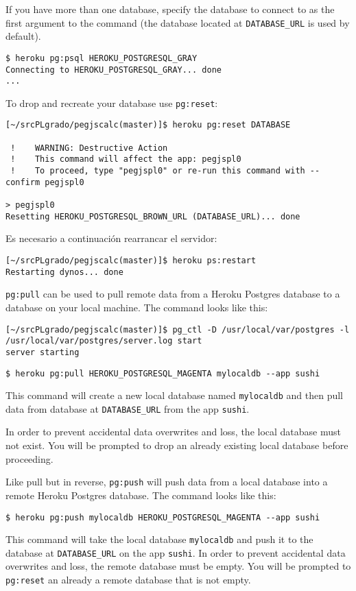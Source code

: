 If you have more than one database, specify the database to connect to as
the first argument to the command (the database located at \verb|DATABASE_URL|
is used by default).
\begin{verbatim}
$ heroku pg:psql HEROKU_POSTGRESQL_GRAY
Connecting to HEROKU_POSTGRESQL_GRAY... done
...
\end{verbatim}

 To drop and recreate your database use \verb|pg:reset|:

\begin{verbatim}
[~/srcPLgrado/pegjscalc(master)]$ heroku pg:reset DATABASE

 !    WARNING: Destructive Action
 !    This command will affect the app: pegjspl0
 !    To proceed, type "pegjspl0" or re-run this command with --confirm pegjspl0

> pegjspl0
Resetting HEROKU_POSTGRESQL_BROWN_URL (DATABASE_URL)... done
\end{verbatim}
Es necesario a continuación rearrancar el servidor:
\begin{verbatim}
[~/srcPLgrado/pegjscalc(master)]$ heroku ps:restart
Restarting dynos... done
\end{verbatim}


\verb|pg:pull| can be used to pull remote data from a Heroku Postgres
database to a database on your local machine. The command looks like this:
\begin{verbatim}
[~/srcPLgrado/pegjscalc(master)]$ pg_ctl -D /usr/local/var/postgres -l /usr/local/var/postgres/server.log start
server starting
\end{verbatim}

\begin{verbatim}
$ heroku pg:pull HEROKU_POSTGRESQL_MAGENTA mylocaldb --app sushi
\end{verbatim}
This command will create a new local database named \verb|mylocaldb| and
then pull data from database at \verb|DATABASE_URL| from the app 
\verb|sushi|. 

In
order to prevent accidental data overwrites and loss, the local database
must not exist. You will be prompted to drop an already existing local
database before proceeding.

Like pull but in reverse, \verb|pg:push| will push data from a local
database into a remote Heroku Postgres database. The command looks
like this:
\begin{verbatim}
$ heroku pg:push mylocaldb HEROKU_POSTGRESQL_MAGENTA --app sushi
\end{verbatim}
This command will take the local database \verb|mylocaldb| 
and push it
to the database at \verb|DATABASE_URL| on the app \verb|sushi|. 
In order to
prevent accidental data overwrites and loss, the remote database must
be empty. You will be prompted to \verb|pg:reset| an already a remote database
that is not empty.


